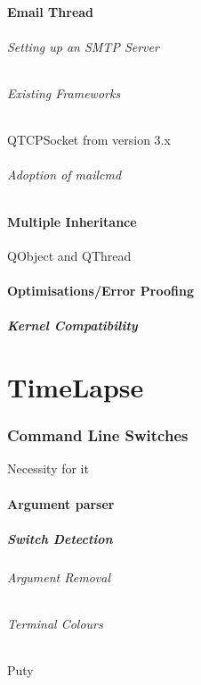 \documentclass[11pt]{article} %
\begin{document}
\subsection{Email Thread}
\paragraph{Setting up an SMTP Server}
\paragraph{Existing Frameworks}{QTCPSocket from version 3.x}
\paragraph{Adoption of mailcmd}
\subsection{Multiple Inheritance}{QObject and QThread}
\subsection{Optimisations/Error Proofing}
\subsubsection{Kernel Compatibility}


\part{TimeLapse}
\section{Command Line Switches}{Necessity for it}
\subsection{Argument parser}
\subsubsection{Switch Detection}
\paragraph{Argument Removal}
\paragraph{Terminal Colours}{Puty}
\end{document}
